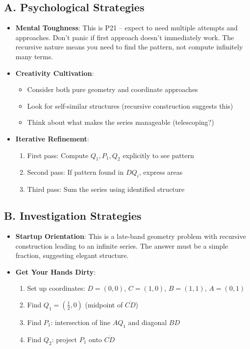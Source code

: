 \documentclass[]{article}
\begin{document}
\begin{strategicbox}
\subsection*{A. Psychological Strategies}
\begin{itemize}[leftmargin=*]
    \item \textbf{Mental Toughness}: This is P21 -- expect to need multiple attempts and approaches. Don't panic if first approach doesn't immediately work. The recursive nature means you need to find the pattern, not compute infinitely many terms.
    
    \item \textbf{Creativity Cultivation}: 
    \begin{itemize}
        \item Consider both pure geometry and coordinate approaches
        \item Look for self-similar structures (recursive construction suggests this)
        \item Think about what makes the series manageable (telescoping?)
    \end{itemize}
    
    \item \textbf{Iterative Refinement}:
    \begin{enumerate}
        \item First pass: Compute $Q_1, P_1, Q_2$ explicitly to see pattern
        \item Second pass: If pattern found in $DQ_i$, express areas
        \item Third pass: Sum the series using identified structure
    \end{enumerate}
\end{itemize}

\subsection*{B. Investigation Strategies}
\begin{itemize}[leftmargin=*]
    \item \textbf{Startup Orientation}: This is a late-band geometry problem with recursive construction leading to an infinite series. The answer must be a simple fraction, suggesting elegant structure.
    
    \item \textbf{Get Your Hands Dirty}:
    \begin{enumerate}
        \item Set up coordinates: $D=(0,0)$, $C=(1,0)$, $B=(1,1)$, $A=(0,1)$
        \item Find $Q_1 = (\frac{1}{2}, 0)$ (midpoint of $\overline{CD}$)
        \item Find $P_1$: intersection of line $AQ_1$ and diagonal $BD$
        \item Find $Q_2$: project $P_1$ onto $\overline{CD}$
    \end{enumerate}
    

\end{itemize}
\end{strategicbox}
\end{document}
